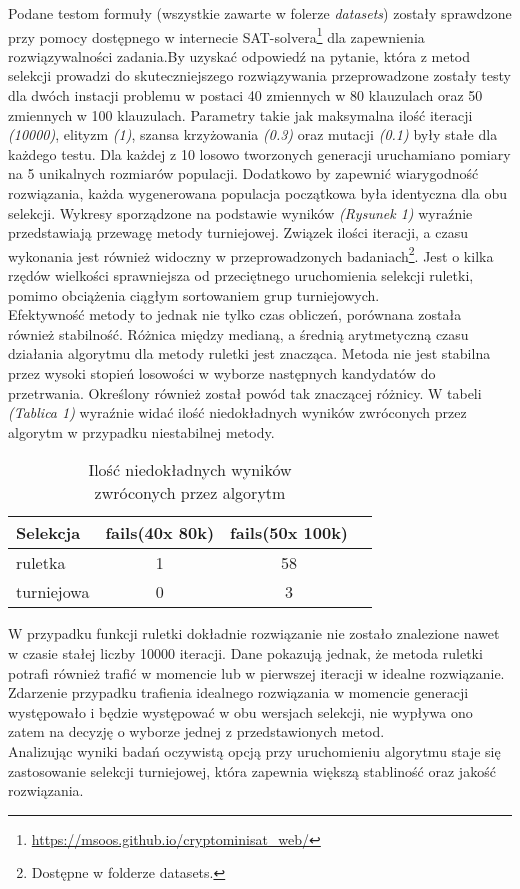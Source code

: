 \documentclass[twoside,twocolumn]{article}
\begin{document}
\indent Podane testom formuły (wszystkie zawarte w folerze \textit{datasets}) zostały sprawdzone przy pomocy dostępnego w internecie SAT-solvera\footnote{\url{https://msoos.github.io/cryptominisat_web/}} dla zapewnienia rozwiązywalności zadania.\newpage By uzyskać odpowiedź na pytanie, która z metod selekcji prowadzi do skuteczniejszego rozwiązywania przeprowadzone zostały testy dla dwóch instacji problemu w postaci 40 zmiennych w 80 klauzulach oraz 50 zmiennych w 100 klauzulach. Parametry takie jak maksymalna ilość iteracji \textit{(10000)}, elityzm \textit{(1)}, szansa krzyżowania \textit{(0.3)} oraz mutacji \textit{(0.1)} były stałe dla każdego testu. Dla każdej z 10 losowo tworzonych generacji uruchamiano pomiary na 5 unikalnych rozmiarów populacji. Dodatkowo by zapewnić wiarygodność rozwiązania, każda wygenerowana populacja początkowa była identyczna dla obu selekcji. Wykresy sporządzone na podstawie wyników \textit{(Rysunek 1)} wyraźnie przedstawiają przewagę metody turniejowej. Związek ilości iteracji, a czasu wykonania jest również widoczny w przeprowadzonych badaniach\footnote{Dostępne w folderze datasets.}. Jest o kilka rzędów wielkości sprawniejsza od przeciętnego uruchomienia selekcji ruletki, pomimo obciążenia ciągłym sortowaniem grup turniejowych.\\ \indent
Efektywność metody to jednak nie tylko czas obliczeń, porównana została również stabilność. Różnica między medianą, a średnią arytmetyczną czasu działania algorytmu dla metody ruletki jest znacząca. Metoda nie jest stabilna przez wysoki stopień losowości w wyborze następnych kandydatów do przetrwania. Określony również został powód tak znaczącej różnicy. W tabeli \textit{(Tablica 1)} wyraźnie widać ilość niedokładnych wyników zwróconych przez algorytm w przypadku niestabilnej metody.
\begin{table}
\caption{Ilość niedokładnych wyników \\zwróconych przez algorytm}
\begin{tabular}{l*{2}{c}r}
Selekcja & fails(40x 80k) & fails(50x 100k) \\
\hline
ruletka & 1 & 58 \\
turniejowa & 0 & 3 \\
\end{tabular}
\end{table}
W przypadku funkcji ruletki dokładnie rozwiązanie nie zostało znalezione nawet w czasie stałej liczby 10000 iteracji. Dane pokazują jednak, że metoda ruletki potrafi również trafić w momencie lub w pierwszej iteracji w idealne rozwiązanie. Zdarzenie przypadku trafienia idealnego rozwiązania w momencie generacji występowało i będzie występować w obu wersjach selekcji, nie wypływa ono zatem na decyzję o wyborze jednej z przedstawionych metod.
\\ \indent Analizując wyniki badań oczywistą opcją przy uruchomieniu algorytmu staje się zastosowanie selekcji turniejowej, która zapewnia większą stabliność oraz jakość rozwiązania.
\end{document}
